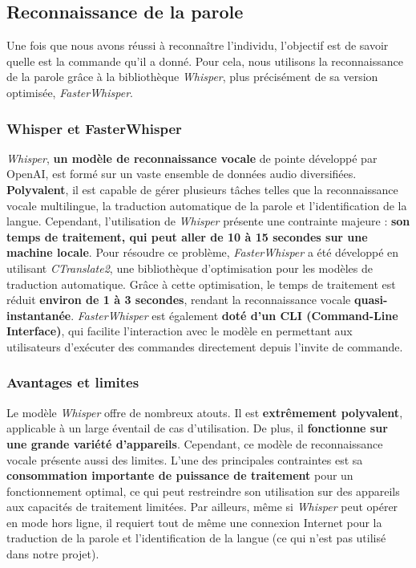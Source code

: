 \subsection{Reconnaissance de la parole}
\label{subsec:Reconnaissance_parole}

Une fois que nous avons réussi à reconnaître l'individu, l'objectif est de
savoir quelle est la commande qu'il a donné. Pour cela, nous utilisons la
reconnaissance de la parole grâce à la bibliothèque \textit{Whisper}, plus
précisément de sa version optimisée, \textit{FasterWhisper}.

\subsubsection*{Whisper et FasterWhisper}

\textit{Whisper}, \textbf{un modèle de reconnaissance vocale} de pointe développé par OpenAI, est formé sur un vaste ensemble de données audio diversifiées. \textbf{Polyvalent}, il est
capable de gérer plusieurs tâches telles que la reconnaissance vocale multilingue, la traduction automatique de la parole et l'identification de la langue.
Cependant, l'utilisation de \textit{Whisper} présente une contrainte majeure : \textbf{son temps de traitement, qui peut aller de 10 à 15 secondes sur une machine locale}.
Pour résoudre ce problème, \textit{FasterWhisper} a été développé en utilisant
\textit{CTranslate2}, une bibliothèque d'optimisation pour les modèles de
traduction automatique. Grâce à cette optimisation, le temps de
	traitement est réduit \textbf{environ de 1 à 3 secondes}, rendant la reconnaissance vocale \textbf{quasi-instantanée}.
\textit{FasterWhisper} est également \textbf{doté d'un CLI (Command-Line Interface)}, qui facilite l'interaction avec le modèle en permettant aux utilisateurs d'exécuter des commandes directement depuis
l'invite de commande.

\subsubsection*{Avantages et limites}

Le modèle \textit{Whisper} offre de nombreux atouts. Il est \textbf{extrêmement
	polyvalent}, applicable à un large éventail de cas d'utilisation. De plus, il
\textbf{fonctionne sur une grande variété d'appareils}. Cependant, ce modèle de
reconnaissance vocale présente aussi des limites. L'une des principales
contraintes est sa \textbf{consommation importante de puissance de traitement}
pour un fonctionnement optimal, ce qui peut restreindre son utilisation sur des
appareils aux capacités de traitement limitées. Par ailleurs, même si
\textit{Whisper} peut opérer en mode hors ligne, il requiert tout de même une
connexion Internet pour la traduction de la parole et l'identification de la
langue (ce qui n'est pas utilisé dans notre projet).

